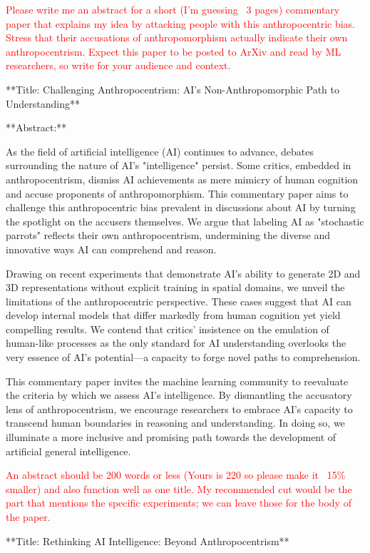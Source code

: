 \documentclass{article}
\begin{document}
\textcolor{red}{Please write me an abstract for a short (I'm guessing ~3 pages) commentary paper that explains my idea by attacking people with this anthropocentric bias. Stress that their accusations of anthropomorphism actually indicate their own anthropocentrism. Expect this paper to be posted to ArXiv and read by ML researchers, so write for your audience and context.}

**Title: Challenging Anthropocentrism: AI's Non-Anthropomorphic Path to Understanding**

**Abstract:**

As the field of artificial intelligence (AI) continues to advance, debates surrounding the nature of AI's "intelligence" persist. Some critics, embedded in anthropocentrism, dismiss AI achievements as mere mimicry of human cognition and accuse proponents of anthropomorphism. This commentary paper aims to challenge this anthropocentric bias prevalent in discussions about AI by turning the spotlight on the accusers themselves. We argue that labeling AI as "stochastic parrots" reflects their own anthropocentrism, undermining the diverse and innovative ways AI can comprehend and reason.

Drawing on recent experiments that demonstrate AI's ability to generate 2D and 3D representations without explicit training in spatial domains, we unveil the limitations of the anthropocentric perspective. These cases suggest that AI can develop internal models that differ markedly from human cognition yet yield compelling results. We contend that critics' insistence on the emulation of human-like processes as the only standard for AI understanding overlooks the very essence of AI's potential—a capacity to forge novel paths to comprehension.

This commentary paper invites the machine learning community to reevaluate the criteria by which we assess AI's intelligence. By dismantling the accusatory lens of anthropocentrism, we encourage researchers to embrace AI's capacity to transcend human boundaries in reasoning and understanding. In doing so, we illuminate a more inclusive and promising path towards the development of artificial general intelligence.

\textcolor{red}{An abstract should be 200 words or less (Yours is 220 so please make it ~15\% smaller) and also function well as one title. My recommended cut would be the part that mentions the specific experiments; we can leave those for the body of the paper.}

**Title: Rethinking AI Intelligence: Beyond Anthropocentrism**
\end{document}
